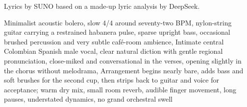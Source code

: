 
\begin{notes}
Lyrics by SUNO based on a made-up lyric analysis by DeepSeek.
\end{notes}
\begin{style}
Minimalist acoustic bolero, slow 4/4 around  seventy-two BPM, nylon-string guitar carrying a restrained habanera pulse, sparse upright bass, occasional brushed percussion and very subtle café-room ambience, Intimate central Colombian Spanish male vocal, clear natural diction with gentle regional pronunciation, close-miked and conversational in the verses, opening slightly in the chorus without melodrama, Arrangement begins nearly bare, adds bass and soft brushes for the second cup, then strips back to guitar and voice for acceptance; warm dry mix, small room reverb, audible finger movement, long pauses, understated dynamics, no grand orchestral swell
\end{style}
